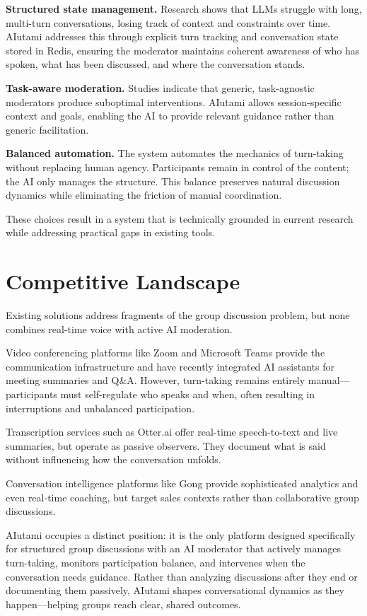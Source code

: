 \textbf{Structured state management.} Research shows that LLMs struggle with long, multi-turn conversations, losing track of context and constraints over time. AIutami addresses this through explicit turn tracking and conversation state stored in Redis, ensuring the moderator maintains coherent awareness of who has spoken, what has been discussed, and where the conversation stands.

\textbf{Task-aware moderation.} Studies indicate that generic, task-agnostic moderators produce suboptimal interventions. AIutami allows session-specific context and goals, enabling the AI to provide relevant guidance rather than generic facilitation.

\textbf{Balanced automation.} The system automates the mechanics of turn-taking without replacing human agency. Participants remain in control of the content; the AI only manages the structure. This balance preserves natural discussion dynamics while eliminating the friction of manual coordination.

These choices result in a system that is technically grounded in current research while addressing practical gaps in existing tools.


\section{Competitive Landscape}

Existing solutions address fragments of the group discussion problem, but none combines real-time voice with active AI moderation.

Video conferencing platforms like Zoom and Microsoft Teams provide the communication infrastructure and have recently integrated AI assistants for meeting summaries and Q\&A. However, turn-taking remains entirely manual---participants must self-regulate who speaks and when, often resulting in interruptions and unbalanced participation.

Transcription services such as Otter.ai offer real-time speech-to-text and live summaries, but operate as passive observers. They document what is said without influencing how the conversation unfolds.

Conversation intelligence platforms like Gong provide sophisticated analytics and even real-time coaching, but target sales contexts rather than collaborative group discussions.

AIutami occupies a distinct position: it is the only platform designed specifically for structured group discussions with an AI moderator that actively manages turn-taking, monitors participation balance, and intervenes when the conversation needs guidance. Rather than analyzing discussions after they end or documenting them passively, AIutami shapes conversational dynamics as they happen---helping groups reach clear, shared outcomes.
